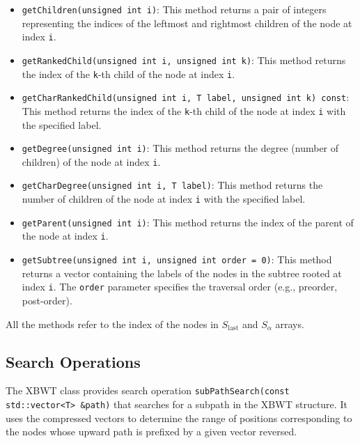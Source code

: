 \begin{itemize}
    \item \texttt{getChildren(unsigned int i)}: This method returns a pair of integers representing the indices of the leftmost and rightmost children of the node at index \texttt{i}.
    \item \texttt{getRankedChild(unsigned int i, unsigned int k)}: This method returns the index of the \texttt{k}-th child of the node at index \texttt{i}.
    \item \texttt{getCharRankedChild(unsigned int i, T label, unsigned int k) const}: This method returns the index of the \texttt{k}-th child of the node at index \texttt{i} with the specified label.
    \item \texttt{getDegree(unsigned int i)}: This method returns the degree (number of children) of the node at index \texttt{i}.
    \item \texttt{getCharDegree(unsigned int i, T label)}: This method returns the number of children of the node at index \texttt{i} with the specified label.
    \item \texttt{getParent(unsigned int i)}: This method returns the index of the parent of the node at index \texttt{i}.
    \item \texttt{getSubtree(unsigned int i, unsigned int order = 0)}: This method returns a vector containing the labels of the nodes in the subtree rooted at index \texttt{i}. The \texttt{order} parameter specifies the traversal order (e.g., preorder, post-order).
\end{itemize}

All the methods refer to the index of the nodes in $S_{\text{last}}$ and $S_{\alpha}$ arrays. 

\subsection{Search Operations}
The XBWT class provides search operation \texttt{subPathSearch(const std::vector<T> \&path)} that searches for a subpath in the XBWT structure. It uses the compressed vectors to determine the range of positions corresponding to the nodes whose upward path is prefixed by a given vector reversed.
